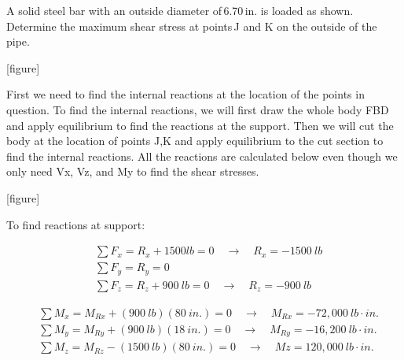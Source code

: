 \documentclass[
  letterpaper,
  DIV=11,
  numbers=noendperiod]{scrreprt}
\theoremstyle{definition}
\theoremstyle{remark}
\begin{document}
\begin{tcolorbox}[enhanced jigsaw, leftrule=.75mm, colbacktitle=quarto-callout-tip-color!10!white, breakable, opacityback=0, colback=white, titlerule=0mm, toprule=.15mm, colframe=quarto-callout-tip-color-frame, coltitle=black, title={Example 14.6}, toptitle=1mm, bottomrule=.15mm, rightrule=.15mm, left=2mm, arc=.35mm, opacitybacktitle=0.6, bottomtitle=1mm]

A solid steel bar with an outside diameter of\,6.70\,in. is loaded as
shown. Determine the maximum shear stress at points\,J and K on the
outside of the pipe.

{[}figure{]}

\begin{tcolorbox}[enhanced jigsaw, leftrule=.75mm, colbacktitle=quarto-callout-tip-color!10!white, breakable, opacityback=0, colback=white, titlerule=0mm, toprule=.15mm, colframe=quarto-callout-tip-color-frame, coltitle=black, title={Solution}, toptitle=1mm, bottomrule=.15mm, rightrule=.15mm, left=2mm, arc=.35mm, opacitybacktitle=0.6, bottomtitle=1mm]

First we need to find the internal reactions at the location of the
points in question. To find the internal reactions, we will first draw
the whole body FBD and apply equilibrium to find the reactions at the
support. Then we will cut the body at the location of points J,K and
apply equilibrium to the cut section to find the internal reactions. All
the reactions are calculated below even though we only need Vx, Vz, and
My to find the shear stresses.

{[}figure{]}

To find reactions at support:

\[
\begin{aligned}
& \sum F_x=R_x+1500{lb}=0 \quad\rightarrow\quad R_x=-1500{~lb} \\
& \sum F_y=R_y=0 \\
& \sum F_z=R_z+900{~lb}=0 \quad\rightarrow\quad R_z=-900{~lb}
\end{aligned}
\]

\[
\begin{aligned}
& \sum M_x=M_{Rx}+(900{~lb})(80{~in.})=0 \quad\rightarrow\quad M_{Rx}=-72,000{~lb}\cdot{in.} \\
& \sum M_y=M_{Ry}+(900{~lb})(18{~in.})=0 \quad\rightarrow\quad M_{Ry}=-16,200{~lb}\cdot{in.} \\
& \sum M_z=M_{Rz}-(1500{~lb})(80{~in.})=0 \quad\rightarrow\quad {Mz}=120,000{~lb}\cdot{in.}
\end{aligned}
\]


\end{tcolorbox}
\end{tcolorbox}
\end{document}

